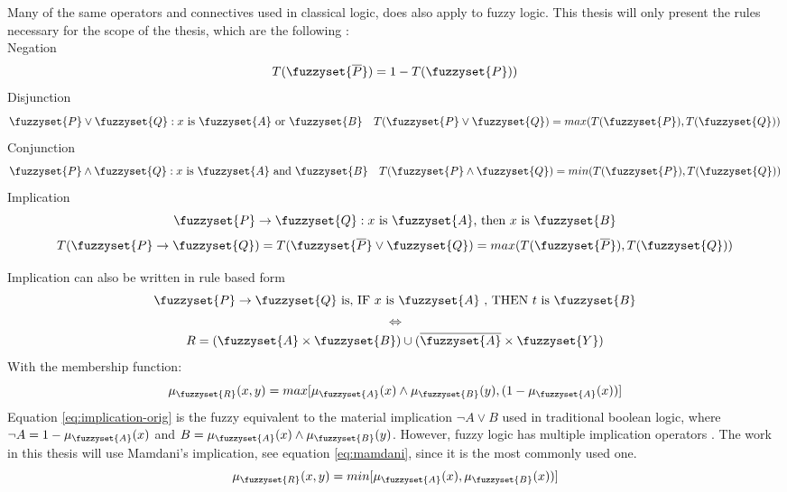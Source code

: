 Many of the same operators and connectives used in classical logic, does also apply to fuzzy logic. This thesis will only present the rules necessary for the scope of the thesis, which are the following \cite{ross2009fuzzy}:\\
\noindent Negation
\begin{equation}
    T(\fuzzyset{\overline{P}})=1-T(\fuzzyset{P})) {}\label{eq:negation}
\end{equation}
Disjunction
\begin{equation}
    \fuzzyset{P}\lor \fuzzyset{Q}:x \text{ is } \fuzzyset{A} \text{ or } \fuzzyset{B}\quad T(\fuzzyset{P} \lor \fuzzyset{Q})=max(T(\fuzzyset{P}),T(\fuzzyset{Q}))\label{eq:disjunction}
\end{equation}
Conjunction
\begin{equation}
    \fuzzyset{P}\land \fuzzyset{Q}:x \text{ is } \fuzzyset{A} \text{ and } \fuzzyset{B}\quad T(\fuzzyset{P} \land \fuzzyset{Q})=min(T(\fuzzyset{P}),T(\fuzzyset{Q}))\label{eq:conjunction}
\end{equation}
Implication
\begin{equation}
    \fuzzyset{P}\to \fuzzyset{Q}: x \text{ is } \fuzzyset{A} \text{, then }x \text{ is } \fuzzyset{B}
    \label{eq:implication}
\end{equation}
\[ T(\fuzzyset{P}\to \fuzzyset{Q})=T(\fuzzyset{\overline{P}}\lor\fuzzyset{Q})=max(T(\fuzzyset{\overline{P}}),T(\fuzzyset{Q}))  \]


\noindent Implication can also be written in rule based form
\[ \fuzzyset{P} \to \fuzzyset{Q} \text{ is,  IF } x \text{ is } \fuzzyset{A} \text{ , THEN } t \text{ is } \fuzzyset{B}\]
\[ \Leftrightarrow \]
\[  R=(\fuzzyset{A}\times\fuzzyset{B})\cup (\overline{\fuzzyset{A}}\times \fuzzyset{Y})\]
\noindent With the membership function:
\begin{equation}
    \mu_{\fuzzyset{R}}(x,y)=max[\mu_{\fuzzyset{A}}(x)\land\mu_{\fuzzyset{B}}(y),(1-\mu_{\fuzzyset{A}}(x))]
    \label{eq:implication-orig}
\end{equation}
Equation \ref{eq:implication-orig} is the fuzzy equivalent to the material implication  $\neg A \lor B$ used in traditional boolean logic\cite{ying2002implication}, where $\neg A = 1-\mu_{\fuzzyset{A}}(x)  $ and $B = \mu_{\fuzzyset{A}}(x)\land\mu_{\fuzzyset{B}}(y)$. However, fuzzy logic has multiple implication operators \cite{ross2009fuzzy}. The work in this thesis will use Mamdani's implication, see equation \ref{eq:mamdani}, since it is the most commonly used one.
\begin{equation}
    \mu_{\fuzzyset{R}}(x,y)=min[\mu_{\fuzzyset{A}}(x),\mu_{\fuzzyset{B}}(x))]
    \label{eq:mamdani}
\end{equation}




